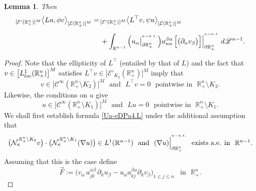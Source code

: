 \documentclass[10pt,a4paper]{amsart}
\newtheorem{lemma}{Lemma}
\begin{document}
\begin{lemma}
Then
%
\begin{align}\label{Ua-eDPa4.L}
{}_{[{\mathcal{E}}'(\mathbb{R}^{n}_{+})]^M}\big\langle Lu,\phi v
\big\rangle_{[{\mathcal{E}}(\mathbb{R}^{n}_{+})]^M}
=&\,
{}_{[{\mathcal{E}}'(\mathbb{R}^{n}_{+})]^M}\big\langle L^{\top}v,
\psi u\big\rangle_{[{\mathcal{E}}(\mathbb{R}^{n}_{+})]^M}
\nonumber\\[4pt]
&\,+\int_{\mathbb{R}^{n-1}}
\Big(u_\alpha\big|_{\partial\mathbb{R}^{n}_{+}}^{{}^{\kappa-{\rm n.t.}}}\Big) 
a^{\beta\alpha}_{nn}\,\Big[\big(\partial_n v_\beta\big)\Big]
\Big|_{\partial\mathbb{R}^{n}_{+}}^{{}^{\kappa-{\rm n.t.}}}\,d{\mathscr{L}}^{n-1}.
\end{align}
\end{lemma}

\begin{proof}
Note that the ellipticity of $L^{\top}$ (entailed by that of $L$) and the 
fact that $v\in\big[L^1_{\rm loc}({\mathbb{R}}^n_{+})\big]^M$ satisfies
$L^{\top}v\in\big[{\mathcal{E}}'_{K_2}(\mathbb{R}^{n}_{+})\big]^M$ imply that 
%
\begin{equation}\label{Di-UPs-4}
v\in\big[{\mathscr{C}}^\infty(\mathbb{R}^{n}_{+}\setminus K_2)\big]^M\,\,\text{ and }\,\,
L^{\top}v=0\,\,\text{ pointwise in }\,\,\mathbb{R}^{n}_{+}\setminus K_2.
\end{equation}
%
Likewise, the conditions on $u$ give  
%
\begin{equation}\label{Di-UabTRF.a}
u\in\big[{\mathscr{C}}^\infty(\mathbb{R}^{n}_{+}\setminus K_1)\big]^M\,\,\text{ and }\,\,
Lu=0\,\,\text{ pointwise in }\,\,\mathbb{R}^{n}_{+}\setminus K_1.
\end{equation}
%
We shall first establish formula \eqref{Ua-eDPa4.L} under the additional assumption that 
%
\begin{equation}\label{Di-UabTRF.b}
\begin{array}{c}
\big({\mathcal{N}}_\kappa^{\,\mathbb{R}^{n}_{+}\setminus K_2}v\big)\cdot
\big({\mathcal{N}}^{\,\mathbb{R}^{n}_{+}\setminus K_1}_\kappa(\nabla u)\big)\in L^1({\mathbb{R}}^{n-1})
\,\,\text{ and }\,\,(\nabla u)\Big|_{\partial\mathbb{R}^{n}_{+}}^{{}^{\kappa-{\rm n.t.}}}\,\,
\text{ exists a.e. in }\,\,{\mathbb{R}}^{n-1}.
\end{array}
\end{equation}
%
Assuming that this is the case define 
%
\begin{equation}\label{Yab-HBBaR46}
\vec{F}:=\Big(v_{\alpha}\,a^{\alpha\beta}_{jk}\,\partial_k u_\beta
-u_\alpha a^{\beta\alpha}_{kj}\partial_k v_{\beta}\Big)_{1\le j\le n}
\,\,\,\text{ in }\,\,{\mathbb{R}}^n_{+}.

\end{equation}
\end{proof}
\end{document}
